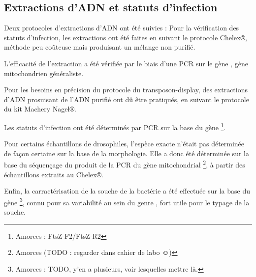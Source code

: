 
\subsection{Extractions d'ADN et statuts d'infection} %
	Deux protocoles d'extractions d'ADN ont été suivies : 
	Pour la vérification des statuts d'infection, les extractions ont été faites en suivant le protocole Chelex®, méthode peu coûteuse mais produisant un mélange non purifié.

	L'efficacité de l'extraction a été vérifiée par le biais d'une PCR sur le gène , gène mitochondrien généraliste.

	Pour les besoins en précision du protocole du transposon-display, des extractions d'ADN prosuisant de l'ADN purifié ont dû être pratiqués, en suivant le protocole du kit Machery Nagel®.

	Les statuts d'infection ont été déterminés par PCR sur la base du gène \footnote{Amorces : FtsZ-F2/FtsZ-R2}.

	Pour certains échantillons de drosophiles, l'espèce exacte n'était pas déterminée de façon certaine sur la base de la morphologie. Elle a donc été déterminée sur la base du séquençage du produit de la PCR du gène mitochondrial \footnote{Amorces (TODO : regarder dans cahier de labo ☺)}, à partir des échantillons extraits au Chelex®.

	Enfin, la carractérisation de la souche de la bactérie a été effectuée sur la base du gène \footnote{Amorces : TODO, y’en a plusieurs, voir lesquelles mettre là.}, connu pour sa variabilité au sein du genre , fort utile pour le typage de la souche.


